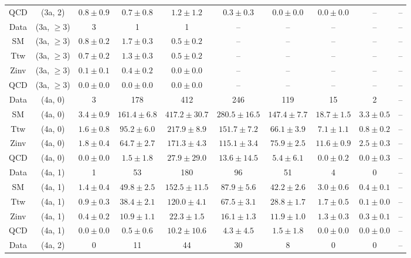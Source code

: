 \begin{table}[h!]
{\begin{tabular}{cccccccccc}
	QCD & (3a, 2) & $0.8\pm 0.9$ & $0.7\pm 0.8$ & $1.2\pm 1.2$ & $0.3\pm 0.3$ & $0.0\pm 0.0$ & $0.0\pm 0.0$ & -- & -- \\[0.5ex] 
	Data & (3a, $\ge3$) & 3 & 1 & 1 & -- & -- & -- & -- & -- \\[0.5ex] 
	SM & (3a, $\ge3$) & $0.8\pm 0.2$ & $1.7\pm 0.3$ & $0.5\pm 0.2$ & -- & -- & -- & -- & -- \\[0.5ex] 
	Ttw & (3a, $\ge3$) & $0.7\pm 0.2$ & $1.3\pm 0.3$ & $0.5\pm 0.2$ & -- & -- & -- & -- & -- \\[0.5ex] 
	Zinv & (3a, $\ge3$) & $0.1\pm 0.1$ & $0.4\pm 0.2$ & $0.0\pm 0.0$ & -- & -- & -- & -- & -- \\[0.5ex] 
	QCD & (3a, $\ge3$) & $0.0\pm 0.0$ & $0.0\pm 0.0$ & $0.0\pm 0.0$ & -- & -- & -- & -- & -- \\[0.5ex] 
	Data & (4a, 0) & 3 & 178 & 412 & 246 & 119 & 15 & 2 & -- \\[0.5ex] 
	SM & (4a, 0) & $3.4\pm 0.9$ & $161.4\pm 6.8$ & $417.2\pm 30.7$ & $280.5\pm 16.5$ & $147.4\pm 7.7$ & $18.7\pm 1.5$ & $3.3\pm 0.5$ & -- \\[0.5ex] 
	Ttw & (4a, 0) & $1.6\pm 0.8$ & $95.2\pm 6.0$ & $217.9\pm 8.9$ & $151.7\pm 7.2$ & $66.1\pm 3.9$ & $7.1\pm 1.1$ & $0.8\pm 0.2$ & -- \\[0.5ex] 
	Zinv & (4a, 0) & $1.8\pm 0.4$ & $64.7\pm 2.7$ & $171.3\pm 4.3$ & $115.1\pm 3.4$ & $75.9\pm 2.5$ & $11.6\pm 0.9$ & $2.5\pm 0.3$ & -- \\[0.5ex] 
	QCD & (4a, 0) & $0.0\pm 0.0$ & $1.5\pm 1.8$ & $27.9\pm 29.0$ & $13.6\pm 14.5$ & $5.4\pm 6.1$ & $0.0\pm 0.2$ & $0.0\pm 0.3$ & -- \\[0.5ex] 
	Data & (4a, 1) & 1 & 53 & 180 & 96 & 51 & 4 & 0 & -- \\[0.5ex] 
	SM & (4a, 1) & $1.4\pm 0.4$ & $49.8\pm 2.5$ & $152.5\pm 11.5$ & $87.9\pm 5.6$ & $42.2\pm 2.6$ & $3.0\pm 0.6$ & $0.4\pm 0.1$ & -- \\[0.5ex] 
	Ttw & (4a, 1) & $0.9\pm 0.3$ & $38.4\pm 2.1$ & $120.0\pm 4.1$ & $67.5\pm 3.1$ & $28.8\pm 1.7$ & $1.7\pm 0.5$ & $0.1\pm 0.0$ & -- \\[0.5ex] 
	Zinv & (4a, 1) & $0.4\pm 0.2$ & $10.9\pm 1.1$ & $22.3\pm 1.5$ & $16.1\pm 1.3$ & $11.9\pm 1.0$ & $1.3\pm 0.3$ & $0.3\pm 0.1$ & -- \\[0.5ex] 
	QCD & (4a, 1) & $0.0\pm 0.0$ & $0.5\pm 0.6$ & $10.2\pm 10.6$ & $4.3\pm 4.5$ & $1.5\pm 1.8$ & $0.0\pm 0.0$ & $0.0\pm 0.0$ & -- \\[0.5ex] 
	Data & (4a, 2) & 0 & 11 & 44 & 30 & 8 & 0 & 0 & -- \\[0.5ex] 

\end{tabular}}
\end{table}
